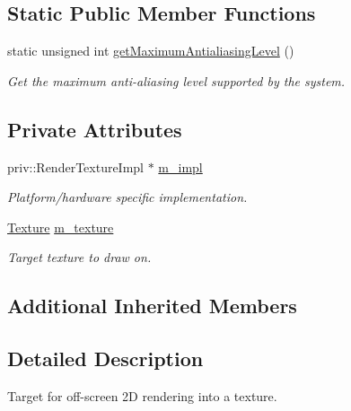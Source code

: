 \subsection*{Static Public Member Functions}
\begin{DoxyCompactItemize}
\item 
static unsigned int \mbox{\hyperlink{classsf_1_1_render_texture_ab0849fc3e064b744ffae1ab1d85ee12b}{get\+Maximum\+Antialiasing\+Level}} ()
\begin{DoxyCompactList}\small\item\em Get the maximum anti-\/aliasing level supported by the system. \end{DoxyCompactList}\end{DoxyCompactItemize}
\subsection*{Private Attributes}
\begin{DoxyCompactItemize}
\item 
\mbox{\label{classsf_1_1_render_texture_a52ff9290c9f48f5430b6cbc28c790b33}} 
priv\+::\+Render\+Texture\+Impl $\ast$ \mbox{\hyperlink{classsf_1_1_render_texture_a52ff9290c9f48f5430b6cbc28c790b33}{m\+\_\+impl}}
\begin{DoxyCompactList}\small\item\em Platform/hardware specific implementation. \end{DoxyCompactList}\item 
\mbox{\label{classsf_1_1_render_texture_ae4638299a9022d2ba2d0fc29b5d550e8}} 
\mbox{\hyperlink{classsf_1_1_texture}{Texture}} \mbox{\hyperlink{classsf_1_1_render_texture_ae4638299a9022d2ba2d0fc29b5d550e8}{m\+\_\+texture}}
\begin{DoxyCompactList}\small\item\em Target texture to draw on. \end{DoxyCompactList}\end{DoxyCompactItemize}
\subsection*{Additional Inherited Members}


\subsection{Detailed Description}
Target for off-\/screen 2D rendering into a texture. 

